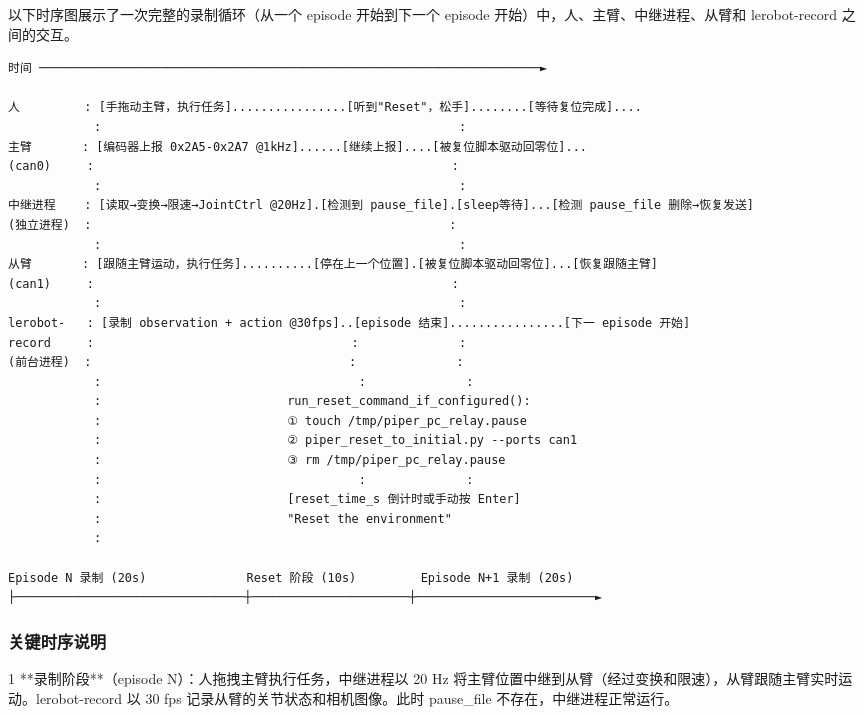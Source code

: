 \documentclass[UTF8,a4paper,11pt]{ctexart}
\begin{document}
{以下时序图展示了一次完整的录制循环（从一个 episode 开始到下一个 episode 开始）中，人、主臂、中继进程、从臂和 lerobot-record 之间的交互。

\begin{lstlisting}[language=text]
时间 ──────────────────────────────────────────────────────────────────────►

人         : [手拖动主臂，执行任务]................[听到"Reset"，松手]........[等待复位完成]....
            :                                                  :
主臂       : [编码器上报 0x2A5-0x2A7 @1kHz]......[继续上报]....[被复位脚本驱动回零位]...
(can0)     :                                                  :
            :                                                  :
中继进程    : [读取→变换→限速→JointCtrl @20Hz].[检测到 pause_file].[sleep等待]...[检测 pause_file 删除→恢复发送]
(独立进程)  :                                                  :
            :                                                  :
从臂       : [跟随主臂运动，执行任务]..........[停在上一个位置].[被复位脚本驱动回零位]...[恢复跟随主臂]
(can1)     :                                                  :
            :                                                  :
lerobot-   : [录制 observation + action @30fps]..[episode 结束]................[下一 episode 开始]
record     :                                    :              :
(前台进程)  :                                    :              :
            :                                    :              :
            :                          run_reset_command_if_configured():
            :                          ① touch /tmp/piper_pc_relay.pause
            :                          ② piper_reset_to_initial.py --ports can1
            :                          ③ rm /tmp/piper_pc_relay.pause
            :                                    :              :
            :                          [reset_time_s 倒计时或手动按 Enter]
            :                          "Reset the environment"
            :

Episode N 录制 (20s)              Reset 阶段 (10s)         Episode N+1 录制 (20s)
├────────────────────────────────┼──────────────────────┼─────────────────────────►
\end{lstlisting}

\subsubsection{关键时序说明}

\item[1] **录制阶段**（episode N）：人拖拽主臂执行任务，中继进程以 20 Hz 将主臂位置中继到从臂（经过变换和限速），从臂跟随主臂实时运动。lerobot-record 以 30 fps 记录从臂的关节状态和相机图像。此时 pause_file 不存在，中继进程正常运行。

}
\end{document}
